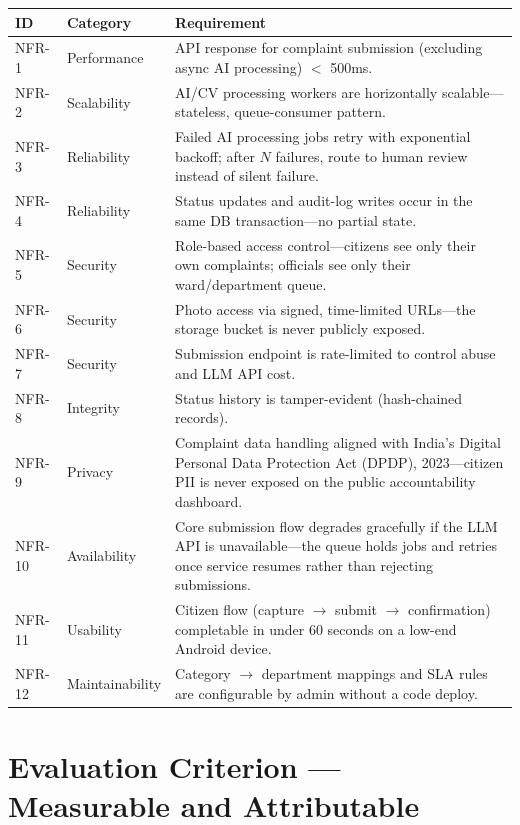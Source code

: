 \documentclass[12pt,a4paper]{article}
\begin{document}
\small
\begin{longtable}{p{} p{} p{}}
\toprule
\textbf{ID} & \textbf{Category} & \textbf{Requirement} \\
\midrule
NFR-1 & Performance & API response for complaint submission (excluding async AI processing) $<$ 500ms. \\
NFR-2 & Scalability & AI/CV processing workers are horizontally scalable---stateless, queue-consumer pattern. \\
NFR-3 & Reliability & Failed AI processing jobs retry with exponential backoff; after $N$ failures, route to human review instead of silent failure. \\
NFR-4 & Reliability & Status updates and audit-log writes occur in the same DB transaction---no partial state. \\
NFR-5 & Security & Role-based access control---citizens see only their own complaints; officials see only their ward/department queue. \\
NFR-6 & Security & Photo access via signed, time-limited URLs---the storage bucket is never publicly exposed. \\
NFR-7 & Security & Submission endpoint is rate-limited to control abuse and LLM API cost. \\
NFR-8 & Integrity & Status history is tamper-evident (hash-chained records). \\
NFR-9 & Privacy & Complaint data handling aligned with India's Digital Personal Data Protection Act (DPDP), 2023---citizen PII is never exposed on the public accountability dashboard. \\
NFR-10 & Availability & Core submission flow degrades gracefully if the LLM API is unavailable---the queue holds jobs and retries once service resumes rather than rejecting submissions. \\
NFR-11 & Usability & Citizen flow (capture $\rightarrow$ submit $\rightarrow$ confirmation) completable in under 60 seconds on a low-end Android device. \\
NFR-12 & Maintainability & Category $\rightarrow$ department mappings and SLA rules are configurable by admin without a code deploy. \\
\bottomrule
\end{longtable}
\normalsize

\section{Evaluation Criterion --- Measurable and Attributable}
\end{document}
